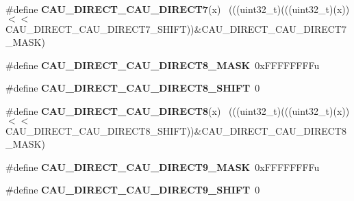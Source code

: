 \begin{DoxyCompactItemize}
\item 
\hypertarget{group___c_a_u___register___masks_ga1949f9632478370720377a41aaa56771}{}\#define {\bfseries C\+A\+U\+\_\+\+D\+I\+R\+E\+C\+T\+\_\+\+C\+A\+U\+\_\+\+D\+I\+R\+E\+C\+T7}(x)                            ~(((uint32\+\_\+t)(((uint32\+\_\+t)(x))$<$$<$C\+A\+U\+\_\+\+D\+I\+R\+E\+C\+T\+\_\+\+C\+A\+U\+\_\+\+D\+I\+R\+E\+C\+T7\+\_\+\+S\+H\+I\+F\+T))\&C\+A\+U\+\_\+\+D\+I\+R\+E\+C\+T\+\_\+\+C\+A\+U\+\_\+\+D\+I\+R\+E\+C\+T7\+\_\+\+M\+A\+S\+K)\label{group___c_a_u___register___masks_ga1949f9632478370720377a41aaa56771}

\item 
\hypertarget{group___c_a_u___register___masks_ga8999b171027ec70233192fd566cdd6fd}{}\#define {\bfseries C\+A\+U\+\_\+\+D\+I\+R\+E\+C\+T\+\_\+\+C\+A\+U\+\_\+\+D\+I\+R\+E\+C\+T8\+\_\+\+M\+A\+S\+K}~0x\+F\+F\+F\+F\+F\+F\+F\+Fu\label{group___c_a_u___register___masks_ga8999b171027ec70233192fd566cdd6fd}

\item 
\hypertarget{group___c_a_u___register___masks_gaae1fbd7c8c40fd07e3928b29d1dcfd0b}{}\#define {\bfseries C\+A\+U\+\_\+\+D\+I\+R\+E\+C\+T\+\_\+\+C\+A\+U\+\_\+\+D\+I\+R\+E\+C\+T8\+\_\+\+S\+H\+I\+F\+T}~0\label{group___c_a_u___register___masks_gaae1fbd7c8c40fd07e3928b29d1dcfd0b}

\item 
\hypertarget{group___c_a_u___register___masks_ga23f80691ac418b1c959a5d6c6972b5e0}{}\#define {\bfseries C\+A\+U\+\_\+\+D\+I\+R\+E\+C\+T\+\_\+\+C\+A\+U\+\_\+\+D\+I\+R\+E\+C\+T8}(x)                            ~(((uint32\+\_\+t)(((uint32\+\_\+t)(x))$<$$<$C\+A\+U\+\_\+\+D\+I\+R\+E\+C\+T\+\_\+\+C\+A\+U\+\_\+\+D\+I\+R\+E\+C\+T8\+\_\+\+S\+H\+I\+F\+T))\&C\+A\+U\+\_\+\+D\+I\+R\+E\+C\+T\+\_\+\+C\+A\+U\+\_\+\+D\+I\+R\+E\+C\+T8\+\_\+\+M\+A\+S\+K)\label{group___c_a_u___register___masks_ga23f80691ac418b1c959a5d6c6972b5e0}

\item 
\hypertarget{group___c_a_u___register___masks_ga5ccc68fd1b7c526efb4a5074bb8039ee}{}\#define {\bfseries C\+A\+U\+\_\+\+D\+I\+R\+E\+C\+T\+\_\+\+C\+A\+U\+\_\+\+D\+I\+R\+E\+C\+T9\+\_\+\+M\+A\+S\+K}~0x\+F\+F\+F\+F\+F\+F\+F\+Fu\label{group___c_a_u___register___masks_ga5ccc68fd1b7c526efb4a5074bb8039ee}

\item 
\hypertarget{group___c_a_u___register___masks_gaca4b04f898d0a3dac43986b076af6f91}{}\#define {\bfseries C\+A\+U\+\_\+\+D\+I\+R\+E\+C\+T\+\_\+\+C\+A\+U\+\_\+\+D\+I\+R\+E\+C\+T9\+\_\+\+S\+H\+I\+F\+T}~0\label{group___c_a_u___register___masks_gaca4b04f898d0a3dac43986b076af6f91}


\end{DoxyCompactItemize}
